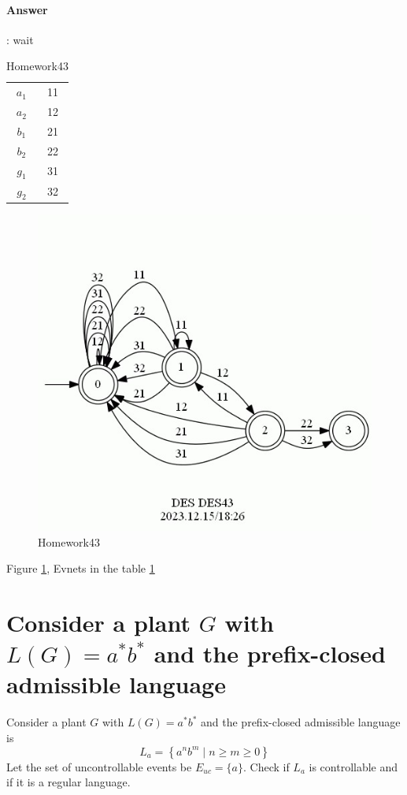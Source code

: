 \documentclass{article}
\begin{document}
\paragraph{Answer}:
wait

\begin{table}
  \centering
  \begin{tabular}{|c|c|}
    $a_1$ & 11\\
    $a_2$ & 12\\
    \hline
    $b_1$ & 21\\
    $b_2$ & 22\\
    \hline
    $g_1$ & 31\\
    $g_2$ & 32\\
  \end{tabular}
  \caption{Homework43}
  \label{tab:des43}
\end{table}

\begin{figure}[h!]
  \centering
  \includegraphics[width=0.6\linewidth]{assets/DES43.jpg}
  \caption{Homework43}
  \label{fig:des43}
\end{figure}

Figure \ref{fig:des43}, Evnets in the table \ref{tab:des43}


\section{Consider a plant $G$ with $L(G)=a^* b^*$ and the prefix-closed admissible language}

Consider a plant $G$ with $L(G)=a^* b^*$ and the prefix-closed admissible language is
$$
L_a=\left\{a^n b^m \mid n \geq m \geq 0\right\}
$$
Let the set of uncontrollable events be $E_{u c}=\{a\}$. Check if $L_a$ is controllable and if it is a regular language.
\end{document}
